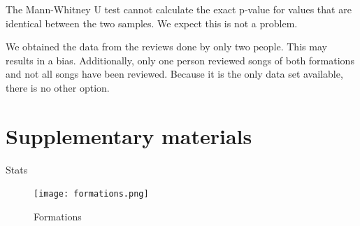 \documentclass{article}
\begin{document}
The Mann-Whitney U test cannot calculate
the exact p-value for values that are identical
between the two samples. We expect this is
not a problem.

We obtained the data from the reviews done
by only two people. This may results in
a bias. 
Additionally, only one person reviewed
songs of both formations and not all
songs have been reviewed.
Because it is the only data
set available, there is no other option.

\section{Supplementary materials}

\begin{table}
  
  \caption{
    Stats
  }
  \label{table:stats}
\end{table}

\begin{figure}[!htbp]
  \texttt{[image: formations.png]}
  \caption{
    Formations
  }
  \label{fig:formations}
\end{figure}
\end{document}
